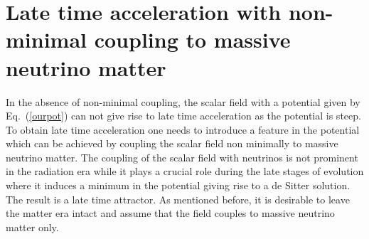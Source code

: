 \documentclass[prd,twocolumn,superscriptaddress]{revtex4}
\begin{document}
\section{Late time acceleration with non-minimal coupling to massive neutrino matter}

In the absence of non-minimal coupling, the scalar field with a potential
given by Eq.~(\ref{ourpot}) can not give rise to late time acceleration  as the potential is steep. To obtain late time 
acceleration one needs to introduce a feature in the potential which can be achieved by  coupling
the scalar field non minimally to massive neutrino matter. The coupling of the scalar  field with neutrinos is not prominent in the radiation era while it  plays
a crucial role during the late stages of evolution where it induces a minimum in the potential giving rise 
to a de Sitter solution. The result is a late time attractor. As mentioned before, it is desirable to leave the matter era 
intact and assume that the field couples to massive neutrino matter only.
\end{document}
